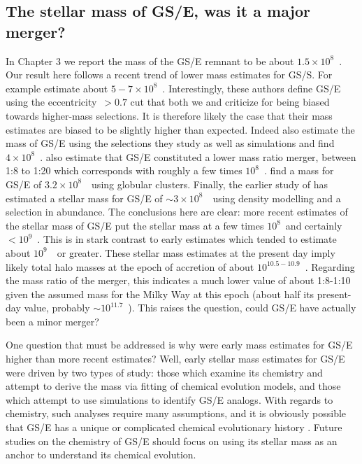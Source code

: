 \subsection{The stellar mass of GS/E, was it a major merger?}

In Chapter 3 we report the mass of the GS/E remnant to be about $1.5\times10^{8}$~\Msun. Our result here follows a recent trend of lower mass estimates for GS/S. For example \textcite{han22} estimate about $5-7\times10^{8}$~\Msun. Interestingly, these authors define GS/E using the eccentricity~$> 0.7$ cut that both we and \textcite{carrillo23} criticize for being biased towards higher-mass selections. It is therefore likely the case that their mass estimates are biased to be slightly higher than expected. Indeed \textcite{carrillo23} also estimate the mass of GS/E using the selections they study as well as simulations and find $4\times10^{8}$~\Msun. \textcite{rey23} also estimate that GS/E constituted a lower mass ratio merger, between 1:8 to 1:20 which corresponds with roughly a few times $10^{8}$~\Msun. \textcite{callingham22} find a mass for GS/E of $3.2\times10^{8}$~\Msun\ using globular clusters. Finally, the earlier study of \textcite{mackereth20} has estimated a stellar mass for GS/E of $\sim 3\times10^{8}$~\Msun\ using density modelling and a selection in abundance. The conclusions here are clear: more recent estimates of the stellar mass of GS/E put the stellar mass at a few times $10^{8}$~\Msun and certainly $< 10^{9}$~\Msun. This is in stark contrast to early estimates which tended to estimate about $10^{9}$~\Msun\ or greater. These stellar mass estimates at the present day imply likely total halo masses at the epoch of accretion of about $10^{10.5-10.9}$~\Msun. Regarding the mass ratio of the merger, this indicates a much lower value of about 1:8-1:10 given the assumed mass for the Milky Way at this epoch (about half its present-day value, probably $\sim 10^{11.7}$~\Msun). This raises the question, could GS/E have actually been a minor merger?

One question that must be addressed is why were early mass estimates for GS/E higher than more recent estimates? Well, early stellar mass estimates for GS/E were driven by two types of study: those which examine its chemistry and attempt to derive the mass via fitting of chemical evolution models, and those which attempt to use simulations to identify GS/E analogs. With regards to chemistry, such analyses require many assumptions, and it is obviously possible that GS/E has a unique or complicated chemical evolutionary history \parencite[e.g. as argued by][]{matsuno21,sanders21}. Future studies on the chemistry of GS/E should focus on using its stellar mass as an anchor to understand its chemical evolution. 

